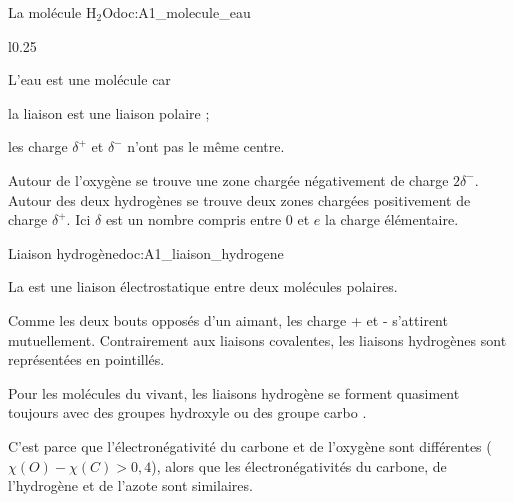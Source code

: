 \begin{doc}{La molécule H$_2$O}{doc:A1_molecule_eau} 
  \begin{wrapfigure}[3]{l}{0.25\linewidth}
    \centering
    \vspace*{-22pt}
  \end{wrapfigure}
  \phantom{b}\vspace*{-20pt}
    
  \begin{encart}
    L'eau est une molécule  car 
    \begin{listePoints}
      \item la liaison  est une liaison polaire ;
      \item les charge $\delta^+$ et $\delta^-$ n'ont pas le même centre.
    \end{listePoints}
  \end{encart}

  Autour de l'oxygène se trouve une zone chargée négativement de charge $2\delta^-$.
  Autour des deux hydrogènes se trouve deux zones chargées positivement de charge $\delta^+$.  
  Ici $\delta$ est un nombre compris entre $0$ et $e$ la charge élémentaire.
\end{doc}

\begin{doc}{Liaison hydrogène}{doc:A1_liaison_hydrogene}
  \begin{encart}
    La  est une liaison électrostatique entre deux molécules polaires.
  \end{encart}
  Comme les deux bouts opposés d'un aimant, les charge + et - s'attirent mutuellement.
  Contrairement aux liaisons covalentes, les liaisons hydrogènes sont représentées en pointillés.

  \begin{encart}  
    Pour les molécules du vivant, les liaisons hydrogène se forment quasiment toujours avec des groupes hydroxyle  ou des groupe carbo .
  \end{encart}
  C'est parce que l'électronégativité du carbone et de l'oxygène sont différentes
  ($\chi(O) - \chi(C) > 0,4$),
  alors que les électronégativités du carbone, de l'hydrogène et de l'azote sont similaires.
\end{doc}

